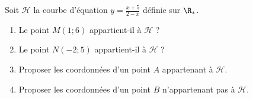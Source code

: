 
Soit $\mathscr{H}$ la courbe d'équation $y=\frac{x+5}{2-x}$ définie sur $\R_*$.
\begin{enumerate}
\item Le point $M(1;6)$ appartient-il à $\mathscr{H}$ ? 
\item Le point $N(-2;5)$ appartient-il à $\mathscr{H}$ ? 
\item Proposer les coordonnées d'un point $A$ appartenant à $\mathscr{H}$. 
\item Proposer les coordonnées d'un point $B$ n'appartenant pas à $\mathscr{H}$. 
\end{enumerate}